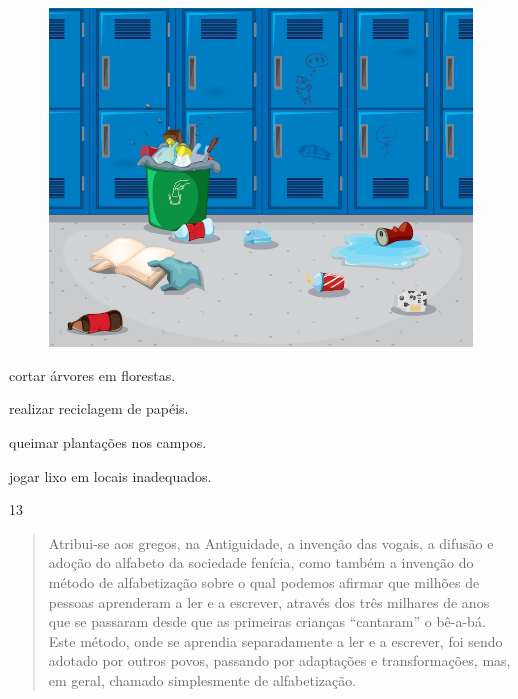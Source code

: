 \begin{figure}[htpb!]
\includegraphics[width=\textwidth]{./imgs/img68.png}
\end{figure}

\begin{minipage}{.5\textwidth}
\begin{escolha}
\item cortar árvores em florestas.

\item realizar reciclagem de papéis.

\item queimar plantações nos campos.

\item jogar lixo em locais inadequados.
\end{escolha}
\end{minipage}

\pagebreak
\num{13}

\begin{quote}
Atribui-se aos gregos, na Antiguidade, a invenção das vogais, a
difusão e adoção do alfabeto da sociedade fenícia, como também a
invenção do método de alfabetização sobre o qual podemos afirmar que
milhões de pessoas aprenderam a ler e a escrever, através dos três
milhares de anos que se passaram desde que as primeiras crianças
“cantaram” o bê-a-bá. Este método, onde se aprendia separadamente a
ler e a escrever, foi sendo adotado por outros povos, passando por
adaptações e transformações, mas, em geral, chamado simplesmente de
alfabetização.

\end{quote}

